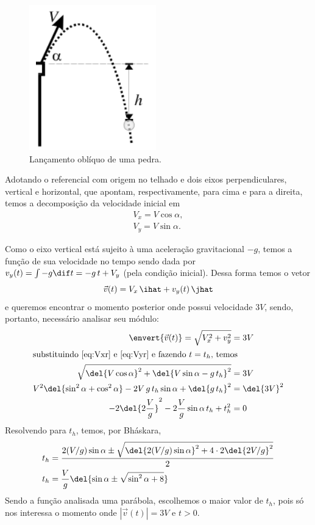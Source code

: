 \documentclass[]{IMTexam}
\begin{document}
\begin{questions}
	\begin{figure}[H]
		\centering
		\includegraphics[height=0.25\textheight]{screenshot002}
		\caption{Lançamento oblíquo de uma pedra.}
		\label{fig:fig1}
	\end{figure}

	\begin{solution}
		Adotando o referencial com origem no telhado e dois eixos perpendiculares, vertical e horizontal, que apontam, respectivamente, para cima e para a direita, temos a decomposição da velocidade inicial em
		\begin{gather}
			V_{x}=V\cos\alpha,\label{eq:Vxr}\\
			V_{y}=V\sin\alpha.\label{eq:Vyr}
		\end{gather}

		Como o eixo vertical está sujeito à uma aceleração gravitacional $ -g $, temos a função de sua velocidade no tempo sendo dada por $ v_y(t)=\int -g\dif t=-g\,t+V_y $ (pela condição inicial). Dessa forma temos o vetor
		\[ \vec{v}(t)=V_x\,\ihat+v_y(t)\,\jhat \]
		e queremos encontrar o momento posterior onde possui velocidade $ 3V $, sendo, portanto, necessário analisar seu módulo:
		\begin{align*}
			\envert{\vec{v}(t)}=\sqrt{V_x^{2}+v_y^{2}}                                     & =3V           \\
			\intertext{substituindo \ref{eq:Vxr} e \ref{eq:Vyr} e fazendo $ t=t_h $, temos}
			\sqrt{\del{V\cos\alpha}^{2}+\del{V\sin\alpha-g\,t_h}^{2}}                      & =3V           \\
			V^{2}\del{\sin^{2}\alpha+\cos^{2}\alpha}-2V\,g\,t_h\sin\alpha+\del{g\,t_h}^{2} & =\del{3V}^{2} \\
			-2\del{2\dfrac{V}{g}}^{2}-2\dfrac{V}{g}\sin\alpha\,t_h+t_h^{2}                 & =0
		\end{align*}
		Resolvendo para $ t_h $, temos, por Bháskara,
		\begin{align*}
			t_h & =\dfrac{2(V/g)\sin\alpha\pm\sqrt{\del{2(V/g)\sin\alpha}^{2}+4\cdot2\del{2V/g}^{2}}}{2} \\
			t_h & =\dfrac{V}{g}\del{\sin\alpha\pm\sqrt{\sin^{2}\alpha+8}}
		\end{align*}
		Sendo a função analisada uma parábola, escolhemos o maior valor de $ t_h $, pois só nos interessa o momento onde $ |\vec{v}(t)|=3V $ e $ t>0 $.


\end{solution}
\end{questions}
\end{document}
